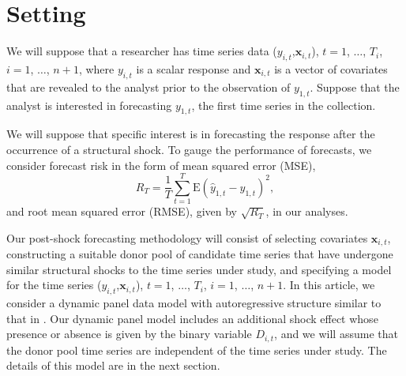 \documentclass[11pt]{article}
\newcommand{\x}{\textbf{x}}
\def\E#1{\mathrm{E}(#1)} %
\theoremstyle{definition}
\begin{document}





\section{Setting}
\label{setting}

We will suppose that a researcher has time series data ($y_{i,t}$,$\x_{i,t}$), $t = 1$, $\ldots$, $T_i$, $i = 1$, $\ldots$, $n+1$, where $y_{i,t}$ is a scalar response and $\x_{i,t}$ is a vector of covariates that are revealed to the analyst prior to the observation of $y_{1,t}$.  Suppose that the analyst is interested in forecasting $y_{1,t}$, the first time series in the collection. 

We will suppose that specific interest is in forecasting the response after the occurrence of a structural shock. To gauge the performance of forecasts, we consider forecast risk in the form of mean squared error (MSE),
$$
  R_T = \frac{1}{T}\sum_{t=1}^T\E{\hat y_{1,t} - y_{1,t}}^2,
$$
and root mean squared error (RMSE), given by $\sqrt{R_T}$, in our analyses. 


Our post-shock forecasting methodology will consist of selecting covariates $\x_{i,t}$, constructing a suitable donor pool of candidate time series that have undergone similar structural shocks to the time series under study, and specifying a model for the time series ($y_{i,t}$,$\x_{i,t}$), $t = 1$, $\ldots$, $T_i$, $i = 1$, $\ldots$, $n+1$. In this article, we consider a dynamic panel data model with autoregressive structure similar to that in \citet{blundell1998initial}. Our dynamic panel model includes an additional shock effect whose presence or absence is given by the binary variable $D_{i,t}$, and we will assume that the donor pool time series are independent of the time series under study. The details of this model are in the next section.
\end{document}

